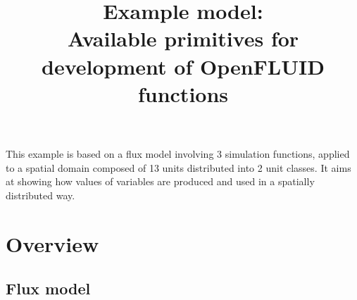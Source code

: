\documentclass[a4paper,11pt]{article}
\begin{document}
\title{Example model:\\Available primitives for development of OpenFLUID functions}
\maketitle


This example is based on a flux model involving 3 simulation functions, 
applied to a spatial domain composed of 13 units distributed into 2 unit classes. 
It aims at showing how values of variables are produced and used in a spatially distributed way.

\bigskip
\bigskip

\section{Overview}

\subsection{Flux model}
\end{document}
